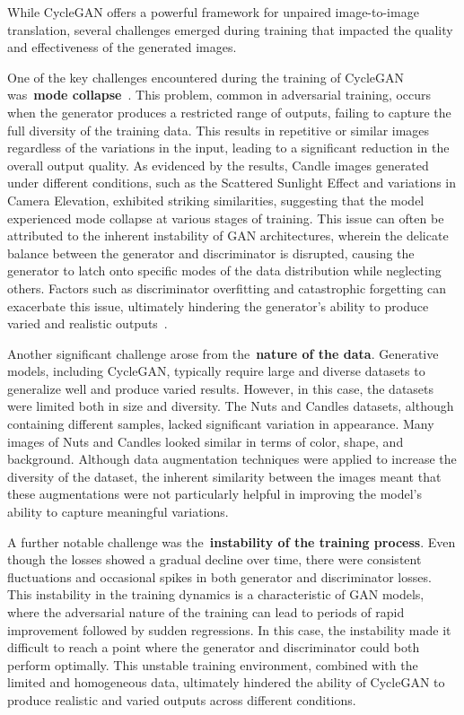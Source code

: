 \documentclass[12pt,DIV14,BCOR12mm,a4paper,footinclude=false,headinclude,parskip=half-,twoside,openright,cleardoublepage=empty,toc=index,bibliography=totoc,listof=totoc]{scrreprt}
\numberwithin{equation}{chapter}
\begin{document}
While CycleGAN offers a powerful framework for unpaired image-to-image translation, several challenges emerged during training that impacted the quality and effectiveness of the generated images.

One of the key challenges encountered during the training of CycleGAN was~\textbf{mode collapse}~\cite{kodali2017convergence}. This problem, common in adversarial training, occurs when the generator produces a restricted range of outputs, failing to capture the full diversity of the training data. This results in repetitive or similar images regardless of the variations in the input, leading to a significant reduction in the overall output quality. As evidenced by the results, Candle images generated under different conditions, such as the Scattered Sunlight Effect and variations in Camera Elevation, exhibited striking similarities, suggesting that the model experienced mode collapse at various stages of training. This issue can often be attributed to the inherent instability of GAN architectures, wherein the delicate balance between the generator and discriminator is disrupted, causing the generator to latch onto specific modes of the data distribution while neglecting others. Factors such as discriminator overfitting and catastrophic forgetting can exacerbate this issue, ultimately hindering the generator's ability to produce varied and realistic outputs~\cite{modecollapse}.

Another significant challenge arose from the~\textbf{nature of the data}. Generative models, including CycleGAN, typically require large and diverse datasets to generalize well and produce varied results. However, in this case, the datasets were limited both in size and diversity. The Nuts and Candles datasets, although containing different samples, lacked significant variation in appearance. Many images of Nuts and Candles looked similar in terms of color, shape, and background. Although data augmentation techniques were applied to increase the diversity of the dataset, the inherent similarity between the images meant that these augmentations were not particularly helpful in improving the model’s ability to capture meaningful variations.

A further notable challenge was the~\textbf{instability of the training process}. Even though the losses showed a gradual decline over time, there were consistent fluctuations and occasional spikes in both generator and discriminator losses. This instability in the training dynamics is a characteristic of GAN models, where the adversarial nature of the training can lead to periods of rapid improvement followed by sudden regressions. In this case, the instability made it difficult to reach a point where the generator and discriminator could both perform optimally. This unstable training environment, combined with the limited and homogeneous data, ultimately hindered the ability of CycleGAN to produce realistic and varied outputs across different conditions.
\end{document}
